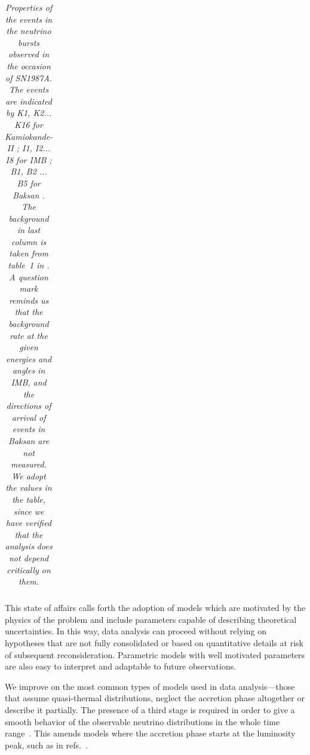 \documentclass[a4paper,11pt]{article}
\newcommand*{\red}{\textcolor{red}}
\begin{document}
\begin{table}[t!]
{\begin{tabular}{||c|rrcc||c|rrcc||}
\end{tabular}}
\caption{\emph{Properties of the events in the neutrino bursts observed  in the occasion of SN1987A. The events are indicated by K1, K2... K16 for Kamiokande-II \cite{hirataPhysRevLett.58.1490,PhysRevD.38.448,Krivoruchenko:1988zg}; I1, I2... I8 for IMB \cite{PhysRevLett.58.1494,PhysRevD.37.3361}; B1, B2 ... B5 for Baksan \cite{ALEXEYEV1988209}. The background in last column is taken from table~1 in \cite{Vissani:2014doa}.
A question mark reminds us that the background rate at the given energies and angles in IMB, and the directions of arrival of events in Baksan are not measured.
We adopt the values in the table, since we have verified that the analysis does not depend critically on them.}
}
\label{tab:tab0}
\end{table}
This state of affairs calls forth the adoption of models which are motivated by  the physics of the problem  and include parameters capable of describing theoretical uncertainties. In this way, data analysis can proceed without relying on hypotheses that are not fully consolidated or based on quantitative details at risk of subsequent reconsideration.
Parametric models with well motivated parameters are also 
easy to interpret and adaptable to future
 observations.
 
We  improve on  the most common types of %
models
used in data analysis—those that assume quasi-thermal distributions, neglect
the accretion phase altogether or describe it partially.
The presence of a  third stage is required in order to give a smooth behavior of the observable neutrino distributions in the whole time range~\cite{sym13101851}.
This amends models where the accretion phase starts at the luminosity peak, such as in refs.~\cite{Loredo:2001rx,Pagliaroli:2008ur,DedinNeto:2023hhp}.

 
\end{document}
